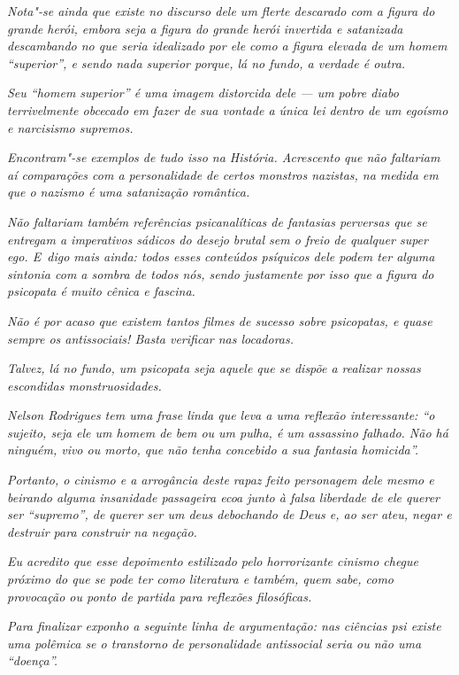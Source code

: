 \emph{Nota"-se ainda que existe no discurso dele um flerte descarado com
a figura do grande herói, embora seja a figura do grande herói invertida
e satanizada descambando no que seria idealizado por ele como a figura
elevada de um homem ``superior'', e sendo nada superior porque, lá no
fundo, a verdade é outra.}~

\emph{Seu ``homem superior'' é uma imagem distorcida dele --- um pobre
diabo terrivelmente obcecado em fazer de sua vontade a única lei dentro
de um egoísmo e narcisismo supremos.}~

\emph{Encontram"-se exemplos de tudo isso na História. Acrescento que não
faltariam aí comparações com a personalidade de certos monstros
nazistas, na medida em que o nazismo é uma satanização romântica.}~

\emph{Não faltariam também referências psicanalíticas de fantasias
perversas que se entregam a imperativos sádicos do desejo brutal sem o
freio de qualquer super ego. E~digo mais ainda: todos esses conteúdos
psíquicos dele podem ter alguma sintonia com a sombra de todos nós,
sendo justamente por isso que a figura do psicopata é muito cênica e
fascina.}~

\emph{Não é por acaso que existem tantos filmes de sucesso sobre
psicopatas, e quase sempre os antissociais! Basta verificar nas
locadoras.}~

\emph{Talvez, lá no fundo, um psicopata seja aquele que se dispõe a
realizar nossas escondidas monstruosidades.}~

\emph{Nelson Rodrigues tem uma frase linda que leva a uma reflexão
interessante: ``o sujeito, seja ele um homem de bem ou um pulha, é um
assassino falhado. Não há ninguém, vivo ou morto, que não tenha
concebido a sua fantasia homicida''.}~

\emph{Portanto, o cinismo e a arrogância deste rapaz feito personagem
dele mesmo e beirando alguma insanidade passageira ecoa junto à falsa
liberdade de ele querer ser ``supremo'', de querer ser um deus
debochando de Deus e, ao ser ateu, negar e destruir para construir na
negação.}~

\emph{Eu acredito que esse depoimento estilizado pelo horrorizante
cinismo chegue próximo do que se pode ter como literatura e também, quem
sabe, como provocação ou ponto de partida para reflexões filosóficas.}~

\emph{Para finalizar exponho a seguinte linha de argumentação: nas
ciências psi existe uma polêmica se o transtorno de personalidade
antissocial seria ou não uma ``doença''.}~

